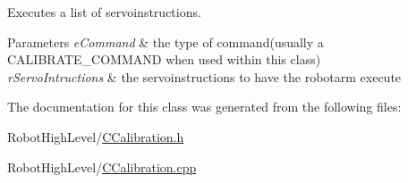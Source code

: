 Executes a list of servoinstructions. 


\begin{DoxyParams}{Parameters}
{\em e\+Command} & the type of command(usually a C\+A\+L\+I\+B\+R\+A\+T\+E\+\_\+\+C\+O\+M\+M\+A\+N\+D when used within this class) \\
\hline
{\em r\+Servo\+Intructions} & the servoinstructions to have the robotarm execute \\
\hline
\end{DoxyParams}


The documentation for this class was generated from the following files\+:\begin{DoxyCompactItemize}
\item 
Robot\+High\+Level/\hyperlink{CCalibration_8h}{C\+Calibration.\+h}\item 
Robot\+High\+Level/\hyperlink{CCalibration_8cpp}{C\+Calibration.\+cpp}\end{DoxyCompactItemize}
